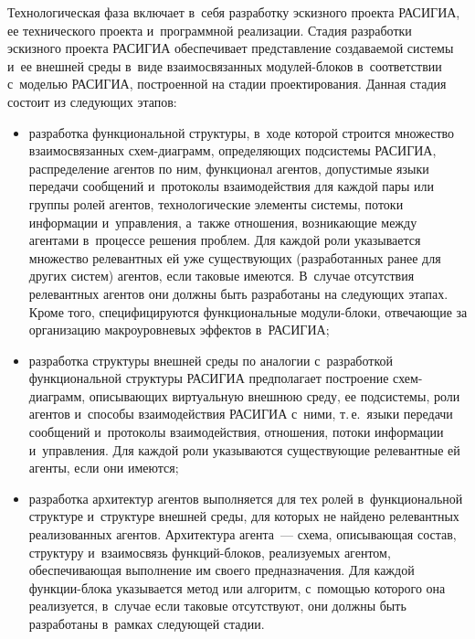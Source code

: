 \begin{multicols}{2}
  Технологическая фаза включает в~себя разработку эскизного проекта 
\mbox{РАСИГИА}, ее технического проекта и~программной реализации. 
Стадия разработки эскизного проекта \mbox{РАСИГИА} обеспечивает 
пред\-став\-ле\-ние создаваемой сис\-те\-мы и~ее внеш\-ней среды в~виде 
взаимосвязанных мо\-ду\-лей-бло\-ков в~соответствии с~моделью 
\mbox{РАСИГИА}, по\-стро\-ен\-ной на стадии проектирования. Данная стадия 
со\-сто\-ит из сле\-ду\-ющих этапов:
  \begin{itemize}
  \item разработка функциональной структуры, в~ходе которой строится 
множество взаимосвязанных схем-диа\-грамм, определяющих под\-сис\-те\-мы 
РАСИГИА, распределение агентов по ним, функционал агентов, до\-пус\-ти\-мые 
языки передачи сообщений и~протоколы взаимодействия для каж\-дой пары или 
группы ролей агентов, технологические элементы сис\-те\-мы, потоки 
информации и~управ\-ле\-ния, а~также отношения, воз\-ни\-ка\-ющие между агентами 
в~процессе решения проб\-лем. Для каждой роли указывается множество 
релевантных ей уже существующих (разработанных ранее для других сис\-тем) 
агентов, если таковые имеются. В~случае отсутствия релевантных агентов они 
должны быть разработаны на сле\-ду\-ющих этапах. Кроме того, 
специфицируются функциональные мо\-ду\-ли-бло\-ки, от\-ве\-ча\-ющие за организацию 
макроуровневых эффектов в~\mbox{РАСИГИА};
  \item разработка структуры внешней среды по аналогии с~разработкой 
функциональной структуры \mbox{РАСИГИА} предполагает построение схем-диа\-грамм, описывающих виртуальную внеш\-нюю среду, ее под\-сис\-те\-мы, роли 
агентов и~способы взаимодействия \mbox{РАСИГИА} с~ними, т.\,е.\ языки 
передачи сообщений и~протоколы взаимодействия, отношения, потоки 
информации и~управ\-ле\-ния. Для каж\-дой роли указываются су\-щест\-ву\-ющие 
релевантные ей агенты, если они имеются;
  \item разработка архитектур агентов выполняется для тех ролей 
в~функциональной структуре и~структуре внеш\-ней среды, для которых не 
найдено релевантных реализованных агентов. Архитектура агента~--- схема, 
описывающая со\-став, структуру и~взаимосвязь функ\-ций-бло\-ков, 
ре\-а\-ли\-зу\-емых агентом, обеспечивающая выполнение им своего предназначения. 
Для каждой функ\-ции-бло\-ка указывается метод или алгоритм, с~по\-мощью 
которого она реализуется, в~случае если таковые отсутствуют, они долж\-ны 
быть разработаны в~рамках сле\-ду\-ющей стадии.
  \end{itemize}
  

\end{multicols}

